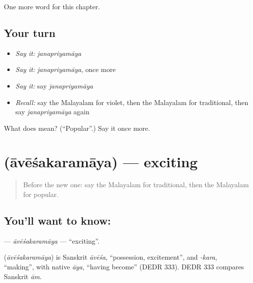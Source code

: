 \begin{grammarlens}[title={What you've built}]
One more word for this chapter.
\end{grammarlens}

\subsection*{Your turn}
\begin{itemize}
\raggedright
  \item \emph{Say it:} \emph{janapriyamāya}
  \item \emph{Say it:} \emph{janapriyamāya}, once more
  \item \emph{Say it:} say \emph{janapriyamāya}
  \item \emph{Recall:} say the Malayalam for violet, then the Malayalam for traditional, then say \emph{janapriyamāya} again
\end{itemize}

\begin{tcolorbox}[breakable,colback=teal!4,colframe=teal!35!black,title={Before you move on}]
What does  mean? (\textquotedblleft{}Popular\textquotedblright{}.) Say it once more.
\end{tcolorbox}
\section[\texorpdfstring{\ml{ആവേശകരമായ} (āvēśakaramāya)}{ആവേശകരമായ (āvēśakaramāya)}]{ (āvēśakaramāya) — exciting}

\label{lesson:ML-C246-avesakaramaya}



\begin{quote}
Before the new one: say the Malayalam for traditional, then the Malayalam for popular.
\end{quote}

\subsection*{You'll want to know: }
\textbf{} — \emph{āvēśakaramāya} — \textquotedblleft{}exciting\textquotedblright{}.

\begin{cousinweb}
\textbf{} (\emph{āvēśakaramāya}) is Sanskrit \emph{āvēśa}, \textquotedblleft{}possession, excitement\textquotedblright{}, and \emph{-kara}, \textquotedblleft{}making\textquotedblright{}, with native \emph{āya}, \textquotedblleft{}having become\textquotedblright{} (DEDR 333). DEDR 333 compares Sanskrit \emph{ām}.
\end{cousinweb}

